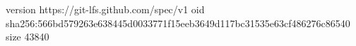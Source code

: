 version https://git-lfs.github.com/spec/v1
oid sha256:566bd579263e638445d0033771f15eeb3649d117bc31535e63cf486276c86540
size 43840
